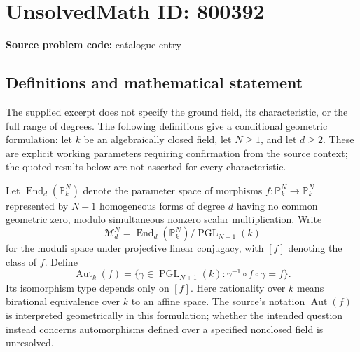 \documentclass[11pt]{article}
\newcommand{\PP}{\mathbb{P}}
\begin{document}
\section*{UnsolvedMath ID: 800392}
\textbf{Source problem code:} catalogue entry
\subsection{Definitions and mathematical statement}
The supplied excerpt does not specify the ground field, its characteristic, or the full range of degrees. The following definitions give a conditional geometric formulation: let \(k\) be an algebraically closed field, let \(N\geq 1\), and let \(d\geq 2\). These are explicit working parameters requiring confirmation from the source context; the quoted results below are not asserted for every characteristic.

Let \(\operatorname{End}_d(\PP_k^N)\) denote the parameter space of morphisms \(f:\PP_k^N\to\PP_k^N\) represented by \(N+1\) homogeneous forms of degree \(d\) having no common geometric zero, modulo simultaneous nonzero scalar multiplication. Write
\[
\mathcal M_d^N=\operatorname{End}_d(\PP_k^N)/\operatorname{PGL}_{N+1}(k)
\]
for the moduli space under projective linear conjugacy, with \([f]\) denoting the class of \(f\). Define
\[
\operatorname{Aut}_k(f)=\{\gamma\in\operatorname{PGL}_{N+1}(k):\gamma^{-1}\circ f\circ\gamma=f\}.
\]
Its isomorphism type depends only on \([f]\). Here rationality over \(k\) means birational equivalence over \(k\) to an affine space. The source's notation \(\operatorname{Aut}(f)\) is interpreted geometrically in this formulation; whether the intended question instead concerns automorphisms defined over a specified nonclosed field is unresolved.
\end{document}
